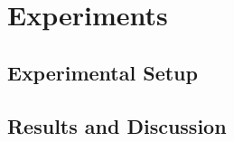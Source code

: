 \section{Experiments}
\label{sec:exp}

\subsection{Experimental Setup}

\subsection{Results and Discussion}

